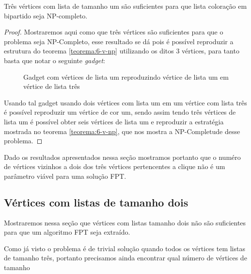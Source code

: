 \begin{teorema}
  Três vértices com lista de tamanho um são suficientes para que lista coloração em bipartido seja NP-completo.
\end{teorema}
\begin{proof}
  Mostraremos aqui como que três vértices são suficientes para que o problema seja NP-Completo, esse resultado se dá pois é possível reproduzir a estrutura do teorema \ref{teorema:6-v-np} utilizando os ditos 3 vértices, para tanto basta que notar o seguinte \emph{gadget}:
  
\begin{figure}[H]
  \begin{subfigure}
    \centering
		
  \end{subfigure}
  \begin{subfigure}
    \centering
		
  \end{subfigure}
  \begin{subfigure}
    \centering
		
  \end{subfigure}
  \caption{Gadget com vértices de lista um reproduzindo vértice de lista um em vértice de lista três}
\end{figure}

Usando tal gadget usando dois vértices com lista um em um vértice com lista três é possível reproduzir um vértice de cor um, sendo assim tendo três vértices de lista um é possível obter seis vértices de lista um e reproduzir a estratégia mostrada no teorema \ref{teorema:6-v-np}, que nos mostra a NP-Completude desse problema.
  
\end{proof}
 Dado os resultados apresentados nessa seção mostramos portanto que o numéro de vértices vizinhos a dois dos três vértices pertencentes a clique não é um parâmetro viável para uma solução FPT.
  
\subsection{Vértices com listas de tamanho dois}
Mostraremos nessa seção que vértices com listas tamanho dois não são suficientes para que um algoritmo FPT seja extraído.

Como já visto o problema é de trivial solução quando todos os vértices tem listas de tamanho três, portanto precisamos ainda encontrar qual número de vértices de tamanho 

